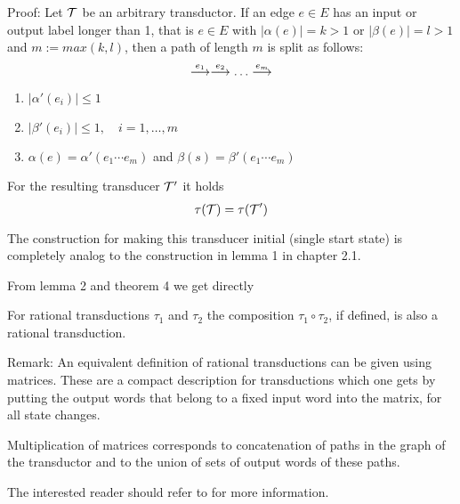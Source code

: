Proof: Let $\mbox{$\mathcal{T}$}$ be an arbitrary transductor. If an edge $e \in E$ has an
input or output label longer than 1, that is $e \in E$ with $|\alpha(e)| = k >
1$ or $|\beta(e)| = l > 1$ and $m := max(k, l)$, then a path of length $m$ is
split as follows:
\[ \stackrel{e_1}{\longrightarrow} \stackrel{e_2}{\longrightarrow} \ldots \stackrel{e_m}{\longrightarrow} \]

\begin{enumerate}
  \item $|\alpha'(e_i)| \leq 1$
  \item $|\beta'(e_i)| \leq 1,\quad i = 1,\ldots,m$
  \item $\alpha(e) = \alpha'(e_1 \cdots e_m)$ and $\beta(s) = \beta'(e_1
  \cdots e_m)$
\end{enumerate}

For the resulting transducer $\mbox{$\mathcal{T'}$}$ it holds \[ \tau(\mbox{$\mathcal{T}$}) = \tau(\mbox{$\mathcal{T}$}')
\]

The construction for making this transducer initial (single start state) is
completely analog to the construction in lemma 1 in chapter 2.1.

From lemma 2 and theorem 4 we get directly

\begin{theorem} For rational transductions $\tau_1$ and $\tau_2$ the composition $\tau_1 \circ
\tau_2$, if defined, is also a rational transduction.
\end{theorem}

Remark: An equivalent definition of rational transductions can be given using
matrices. These are a compact description for transductions which one gets by
putting the output words that belong to a fixed input word into the matrix, for
all state changes.

Multiplication of matrices corresponds to concatenation of paths in the graph of
the transductor and to the union of sets of output words of these paths.

The interested reader should refer to \cite{Be} for more information.

















